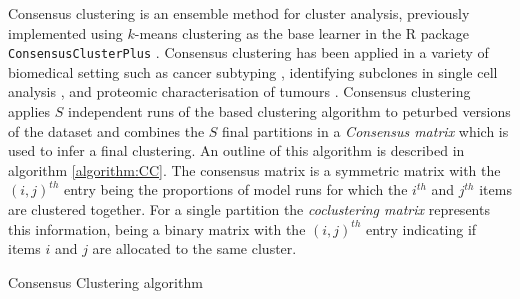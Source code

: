 \documentclass[]{article}
\begin{document}
Consensus clustering \citep{monti2003consensus} is an ensemble method for cluster analysis, previously implemented using $k$-means clustering as the base learner in the R package \texttt{ConsensusClusterPlus} \citep{wilkerson2010consensusclusterplus}. Consensus clustering has been applied in a variety of biomedical setting such as cancer subtyping \citep{lehmann2011identification, verhaak2010integrated}, identifying subclones in single cell analysis \citep{kiselev2017sc3}, and proteomic characterisation of tumours \citep{xu2020integrative}. Consensus clustering applies $S$ independent runs of the based clustering algorithm to peturbed versions of the dataset and combines the $S$ final partitions in a \emph{Consensus matrix} which is used to infer a final clustering. An outline of this algorithm is described in algorithm \ref{algorithm:CC}. The consensus matrix is a symmetric matrix with the $(i, j)^{th}$ entry being the proportions of model runs for which the $i^{th}$ and $j^{th}$ items are clustered together. For a single partition the \emph{coclustering matrix} represents this information, being a binary matrix with the $(i, j)^{th}$ entry indicating if items $i$ and $j$ are allocated to the same cluster.

\begin{algorithm} \label{algorithm:CC}
	\caption{Consensus Clustering algorithm}
\end{algorithm}
\end{document}

